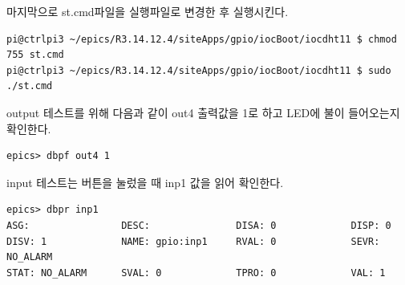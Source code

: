 \documentclass[11pt
  , a4paper
  , article
  , oneside
]{memoir}
\begin{document}
마지막으로 st.cmd파일을 실행파일로 변경한 후 실행시킨다.
\begin{lstlisting}[style=termstyle]
pi@ctrlpi3 ~/epics/R3.14.12.4/siteApps/gpio/iocBoot/iocdht11 $ chmod 755 st.cmd
pi@ctrlpi3 ~/epics/R3.14.12.4/siteApps/gpio/iocBoot/iocdht11 $ sudo ./st.cmd
\end{lstlisting}
output 테스트를 위해 다음과 같이 out4 출력값을 1로 하고 LED에 불이 들어오는지 확인한다.
\begin{lstlisting}[style=termstyle]
epics> dbpf out4 1
\end{lstlisting}
input 테스트는 버튼을 눌렀을 때 inp1 값을 읽어 확인한다.
\begin{lstlisting}[style=termstyle]
epics> dbpr inp1
ASG:                DESC:               DISA: 0             DISP: 0             
DISV: 1             NAME: gpio:inp1     RVAL: 0             SEVR: NO_ALARM      
STAT: NO_ALARM      SVAL: 0             TPRO: 0             VAL: 1
\end{lstlisting}
\end{document}
